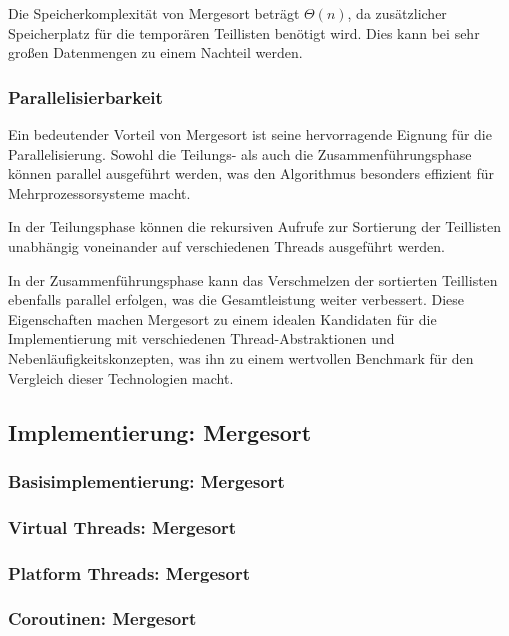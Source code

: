 \documentclass[fontsize=12pt,paper=a4,twoside=semi,parskip=half-,headsepline,headinclude]{scrreprt}
\begin{document}
Die Speicherkomplexität von Mergesort beträgt $\Theta(n)$, da zusätzlicher Speicherplatz für die temporären Teillisten benötigt wird. Dies kann bei sehr großen Datenmengen zu einem Nachteil werden.

\subsubsection{Parallelisierbarkeit}

Ein bedeutender Vorteil von Mergesort ist seine hervorragende Eignung für die Parallelisierung. Sowohl die Teilungs- als auch die Zusammenführungsphase können parallel ausgeführt werden, was den Algorithmus besonders effizient für Mehrprozessorsysteme macht.

In der Teilungsphase können die rekursiven Aufrufe zur Sortierung der Teillisten unabhängig voneinander auf verschiedenen Threads ausgeführt werden.

In der Zusammenführungsphase kann das Verschmelzen der sortierten Teillisten ebenfalls parallel erfolgen, was die Gesamtleistung weiter verbessert.
Diese Eigenschaften machen Mergesort zu einem idealen Kandidaten für die Implementierung mit verschiedenen Thread-Abstraktionen und Nebenläufigkeitskonzepten, was ihn zu einem wertvollen Benchmark für den Vergleich dieser Technologien macht.

\subsection{Implementierung: Mergesort}

\subsubsection{Basisimplementierung: Mergesort}

\subsubsection{Virtual Threads: Mergesort}

\subsubsection{Platform Threads: Mergesort}

\subsubsection{Coroutinen: Mergesort}
\end{document}
